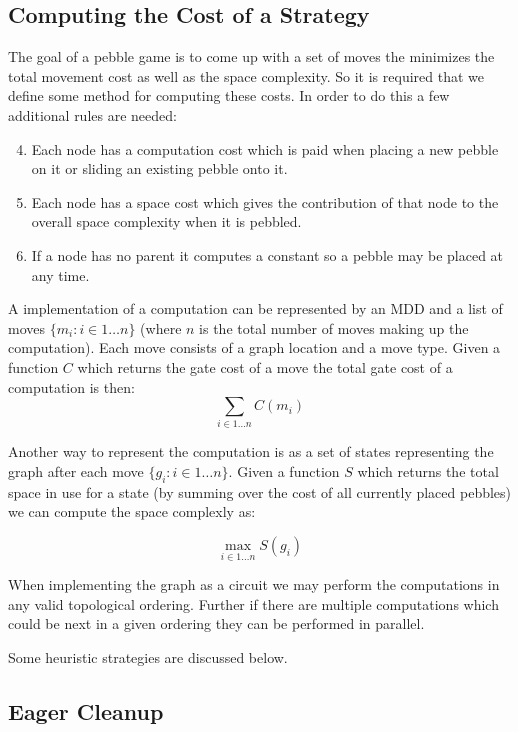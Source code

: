 \subsection{Computing the Cost of a Strategy}

The goal of a pebble game is to come up with a set of moves the minimizes the
total movement cost as well as the space complexity. So it is required that we
define some method for computing these costs. In order to do this a few
additional rules are needed:

\begin{enumerate}
    \setcounter{enumi}{3}
  \item Each node has a computation cost which is paid when placing a new pebble on
    it or sliding an existing pebble onto it.
  \item Each node has a space cost which gives the contribution of that node to
    the overall space complexity when it is pebbled.
  \item If a node has no parent it computes a constant so a pebble may be placed
    at any time.
\end{enumerate}

A implementation of a computation can be represented by an MDD and a list of
moves $\{m_i:i \in 1 \dotsc n\}$ (where $n$ is the total number of moves making up the
computation). Each move consists of a graph location and a move type. Given
a function $C$ which returns the gate cost of a move the total gate cost of a
computation is then:
\[ \sum_{i\in 1 \dotsc n} C(m_i) \]

Another way to represent the computation is as a set of states representing the
graph after each move $\{g_i:i \in 1 \dotsc n\}$. Given a function $S$ which
returns the total space in use for a state (by summing over the cost of all
currently placed pebbles) we can compute the space complexly as:

\[ \max_{i\in 1 \dotsc n} S(g_i) \]


When implementing the graph as a circuit we may perform the computations in any
valid topological ordering. Further if there are multiple computations which
could be next in a given ordering they can be performed in parallel.

Some heuristic strategies are discussed below.

\subsection{Eager Cleanup}

